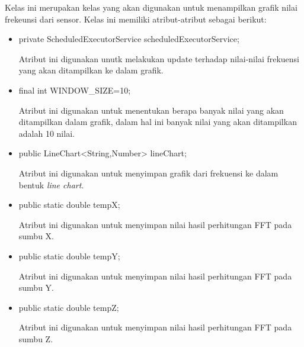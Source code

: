 Kelas ini merupakan kelas yang akan digunakan untuk menampilkan grafik nilai frekeunsi dari sensor. Kelas ini memiliki atribut-atribut sebagai berikut:

\begin{itemize}
    \item private ScheduledExecutorService scheduledExecutorService;
    
    Atribut ini digunakan unutk melakukan update terhadap nilai-nilai frekuensi yang akan ditampilkan ke dalam grafik.
    
    \item final int WINDOW\_SIZE=10;
    
    Atribut ini digunakan untuk menentukan berapa banyak nilai yang akan ditampilkan dalam grafik, dalam hal ini banyak nilai yang akan ditampilkan adalah 10 nilai.
    
    \item public LineChart<String,Number> lineChart;
    
    Atribut ini digunakan untuk menyimpan grafik dari frekuensi ke dalam bentuk \textit{line chart}.
    
    \item public static double tempX;
    
    Atribut ini digunakan untuk menyimpan nilai hasil perhitungan FFT pada sumbu X.
    
    \item public static double tempY;
    
    Atribut ini digunakan untuk menyimpan nilai hasil perhitungan FFT pada sumbu Y.
    
    \item public static double tempZ;
    
    Atribut ini digunakan untuk menyimpan nilai hasil perhitungan FFT pada sumbu Z.
\end{itemize}

